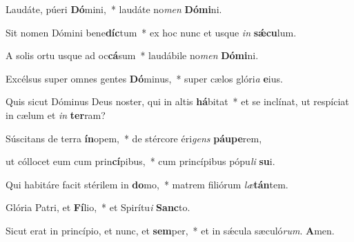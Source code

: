 \item Laudáte, púeri \textbf{Dó}mini,~* laudáte no\textit{men} \textbf{Dómi}ni.

\item Sit nomen Dómini bene\textbf{díc}tum~* ex hoc nunc et usque \textit{in} \textbf{sǽcu}lum.

\item A solis ortu usque ad oc\textbf{cá}sum~* laudábile no\textit{men} \textbf{Dómi}ni.

\item Excélsus super omnes gentes \textbf{Dó}minus,~* super cælos glóri\textit{a} \textbf{e}ius.

\item Quis sicut Dóminus Deus noster, qui in altis \textbf{há}bitat~* et se inclínat, ut respíciat in cælum et \textit{in} \textbf{ter}ram?

\item Súscitans de terra \textbf{ín}opem,~* de stércore éri\textit{gens} \textbf{páupe}rem,

\item ut cóllocet eum cum prin\textbf{cí}pibus,~* cum princípibus pópu\textit{li} \textbf{su}i.

\item Qui habitáre facit stérilem in \textbf{do}mo,~* matrem filiórum \textit{læ}\textbf{tán}tem.

\item Glória Patri, et \textbf{Fí}lio,~* et Spirítu\textit{i} \textbf{Sanc}to.

\item Sicut erat in princípio, et nunc, et \textbf{sem}per,~* et in sǽcula sæculó\textit{rum}. \textbf{A}men.